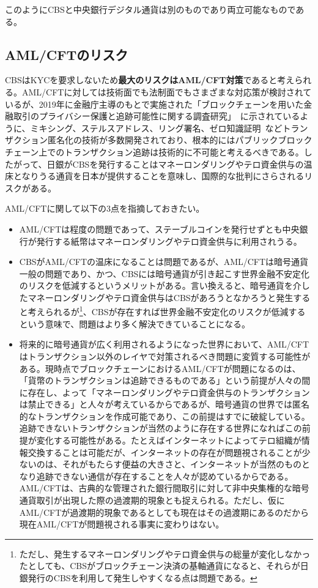 \documentclass[dvipdfmx,a4paper]{jsarticle}
\begin{document}
このようにCBSと中央銀行デジタル通貨は別のものであり両立可能なものである。

\subsection{AML/CFTのリスク}

CBSはKYCを要求しないため\textbf{最大のリスクはAML/CFT対策}であると考えられる。AML/CFTに対しては技術面でも法制面でもさまざまな対応策が検討されているが、2019年に金融庁主導のもとで実施された「ブロックチェーンを用いた金融取引のプライバシー保護と追跡可能性に関する調査研究」~\cite{blockchainprivacy}に示されているように、ミキシング、ステルスアドレス、リング署名、ゼロ知識証明~\cite{sasson2014zerocash}などトランザクション匿名化の技術が多数開発されており、根本的にはパブリックブロックチェーン上でのトランザクション追跡は技術的に不可能と考えるべきである。したがって、日銀がCBSを発行することはマネーロンダリングやテロ資金供与の温床となりうる通貨を日本が提供することを意味し、国際的な批判にさらされるリスクがある。

AML/CFTに関して以下の3点を指摘しておきたい。

\begin{itemize}
\item AML/CFTは程度の問題であって、ステーブルコインを発行せずとも中央銀行が発行する紙幣はマネーロンダリングやテロ資金供与に利用されうる。
\item CBSがAML/CFTの温床になることは問題であるが、AML/CFTは暗号通貨一般の問題であり、かつ、CBSには暗号通貨が引き起こす世界金融不安定化のリスクを低減するというメリットがある。言い換えると、暗号通貨を介したマネーロンダリングやテロ資金供与はCBSがあろうとなかろうと発生すると考えられるが\footnote{ただし、発生するマネーロンダリングやテロ資金供与の総量が変化しなかったとしても、CBSがブロックチェーン決済の基軸通貨になると、それらが日銀発行のCBSを利用して発生しやすくなる点は問題である。}、CBSが存在すれば世界金融不安定化のリスクが低減するという意味で、問題はより多く解決できていることになる。
\item 将来的に暗号通貨が広く利用されるようになった世界において、AML/CFTはトランザクション以外のレイヤで対策されるべき問題に変質する可能性がある。現時点でブロックチェーンにおけるAML/CFTが問題になるのは、「貨幣のトランザクションは追跡できるものである」という前提が人々の間に存在し、よって「マネーロンダリングやテロ資金供与のトランザクションは禁止できる」と人々が考えているからであるが、暗号通貨の世界では匿名的なトランザクションを作成可能であり、この前提はすでに破綻している。追跡できないトランザクションが当然のように存在する世界になればこの前提が変化する可能性がある。たとえばインターネットによってテロ組織が情報交換することは可能だが、インターネットの存在が問題視されることが少ないのは、それがもたらす便益の大きさと、インターネットが当然のものとなり追跡できない通信が存在することを人々が認めているからである。AML/CFTは、古典的な管理された銀行間取引に対して非中央集権的な暗号通貨取引が出現した際の過渡期的現象とも捉えられる。ただし、仮にAML/CFTが過渡期的現象であるとしても現在はその過渡期にあるのだから現在AML/CFTが問題視される事実に変わりはない。
\end{itemize}
\end{document}
